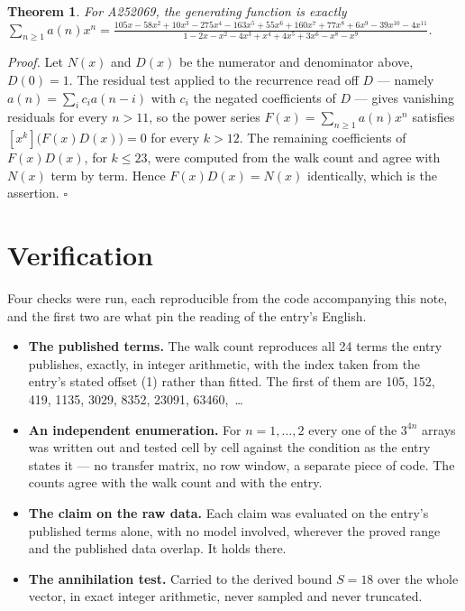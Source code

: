 \documentclass[11pt]{article}
\newtheorem{theorem}{Theorem}
\theoremstyle{definition}
\begin{document}
\begin{theorem} For A252069, the generating function is exactly $\sum_{n\ge 1} a(n)x^n = \frac{105x - 58x^{2} + 10x^{3} - 275x^{4} - 163x^{5} + 55x^{6} + 160x^{7} + 77x^{8} + 6x^{9} - 39x^{10} - 4x^{11}}{1 - 2x - x^{2} - 4x^{3} + x^{4} + 4x^{5} + 3x^{6} - x^{8} - x^{9}}$.\end{theorem}

{\itshape Proof.} Let $N(x)$ and $D(x)$ be the numerator and denominator above, $D(0)=1$. The residual test applied to the recurrence read off $D$ --- namely $a(n) = \sum_i c_i a(n-i)$ with $c_i$ the negated coefficients of $D$ --- gives vanishing residuals for every $n > 11$, so the power series $F(x)=\sum_{n\ge 1}a(n)x^n$ satisfies $[x^k]\bigl(F(x)D(x)\bigr) = 0$ for every $k > 12$. The remaining coefficients of $F(x)D(x)$, for $k \le 23$, were computed from the walk count and agree with $N(x)$ term by term. Hence $F(x)D(x) = N(x)$ identically, which is the assertion. $\square$

\section{Verification}

Four checks were run, each reproducible from the code accompanying this note, and the first two are what pin the reading of the entry's English.

\begin{itemize}

\item {\bfseries The published terms.} The walk count reproduces all 24 terms the entry publishes, exactly, in integer arithmetic, with the index taken from the entry's stated offset (1) rather than fitted. The first of them are 105, 152, 419, 1135, 3029, 8352, 23091, 63460,~\dots

\item {\bfseries An independent enumeration.} For $n = 1,\dots,2$ every one of the $3^{4n}$ arrays was written out and tested cell by cell against the condition as the entry states it --- no transfer matrix, no row window, a separate piece of code. The counts agree with the walk count and with the entry.

\item {\bfseries The claim on the raw data.} Each claim was evaluated on the entry's published terms alone, with no model involved, wherever the proved range and the published data overlap. It holds there.

\item {\bfseries The annihilation test.} Carried to the derived bound $S = 18$ over the whole vector, in exact integer arithmetic, never sampled and never truncated.

\end{itemize}
\end{document}
